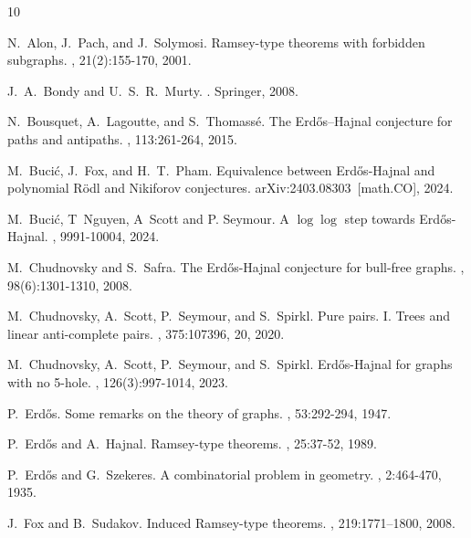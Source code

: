 \documentclass[a4paper,11pt]{article}
\begin{document}
\begin{thebibliography}{10}

N.~Alon, J.~Pach, and J.~Solymosi.
\newblock Ramsey-type theorems with forbidden subgraphs.
, 21(2):155-170, 2001.

J.~A.~Bondy and U.~S.~R.~Murty.
. Springer, 2008.

N.~Bousquet, A.~Lagoutte, and S.~Thomass\'{e}.
\newblock The Erd\H{o}s–Hajnal conjecture for paths and 
antipaths.
, 113:261-264, 2015.

M.~Buci\'{c}, J.~Fox, and H.~T.~Pham.
\newblock Equivalence between Erd\H{o}s-Hajnal and polynomial R\"odl and Nikiforov conjectures.
\newblock arXiv:2403.08303~[math.CO], 2024.

M.~Buci\'{c}, T~Nguyen, A~Scott and P. Seymour.
\newblock A $\log \log$ step towards Erd\H{o}s-Hajnal.
, 9991-10004, 2024.

M.~Chudnovsky and S.~Safra.
\newblock The Erd\H{o}s-Hajnal conjecture for bull-free graphs.
, 98(6):1301-1310, 2008.

M.~Chudnovsky, A.~Scott, P.~Seymour, and S.~Spirkl.
\newblock Pure pairs. I. Trees and linear anti-complete pairs.
, 375:107396, 20, 2020.

M.~Chudnovsky, A.~Scott, P.~Seymour, and S.~Spirkl.
\newblock Erd\H{o}s-Hajnal for graphs with no 5-hole.
, 126(3):997-1014, 2023.

P.~Erd\H{o}s.
\newblock Some remarks on the theory of graphs.
, 53:292-294, 1947.

P.~Erd\H{o}s and A.~Hajnal.
\newblock Ramsey-type theorems.
, 25:37-52, 1989.

P.~Erd\H{o}s and G.~Szekeres.
\newblock A combinatorial problem in geometry.
, 2:464-470, 1935.

J.~Fox and B.~Sudakov.
\newblock Induced Ramsey-type theorems.
, 219:1771–1800, 2008.


\end{thebibliography}
\end{document}
